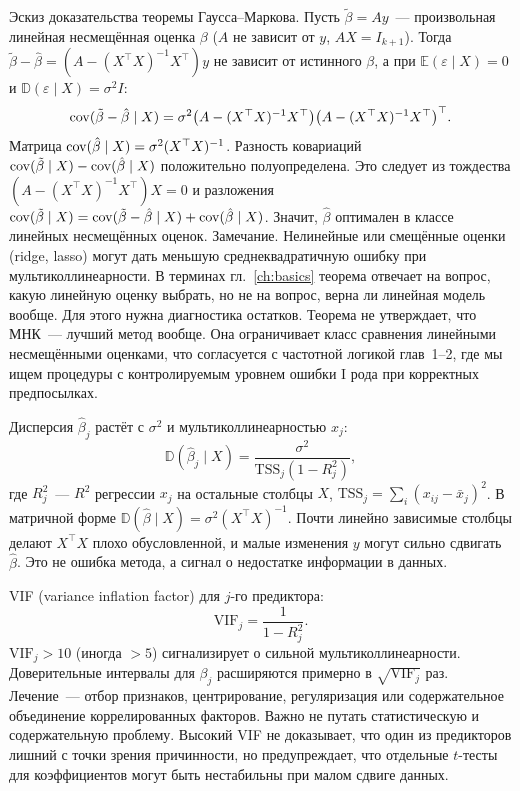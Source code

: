Эскиз доказательства теоремы Гаусса--Маркова. Пусть $\tilde\beta=Ay$~--- произвольная линейная несмещённая оценка $\beta$ ($A$ не зависит от $y$, $AX=I_{k+1}$).
Тогда $\tilde\beta-\hat\beta=(A-(X^\top X)^{-1}X^\top)y$ не зависит от истинного $\beta$, а при $\mathbb{E}(\varepsilon\mid X)=0$ и $\mathbb{D}(\varepsilon\mid X)=\sigma^2 I$:
\[ \operatorname{cov}(\tilde\beta-\hat\beta\mid X) =\sigma^2\bigl(A-(X^\top X)^{-1}X^\top\bigr) \bigl(A-(X^\top X)^{-1}X^\top\bigr)^\top.
\]
Матрица $\operatorname{cov}(\hat\beta\mid X)=\sigma^2(X^\top X)^{-1}$.
Разность ковариаций $\operatorname{cov}(\tilde\beta\mid X)-\operatorname{cov}(\hat\beta\mid X)$ положительно полуопределена. Это следует из тождества $(A-(X^\top X)^{-1}X^\top)X=0$ и разложения $\operatorname{cov}(\tilde\beta\mid X)=\operatorname{cov}(\tilde\beta-\hat\beta\mid X)+\operatorname{cov}(\hat\beta\mid X)$.
Значит, $\hat\beta$ оптимален в классе линейных несмещённых оценок.
Замечание. Нелинейные или смещённые оценки (ridge, lasso) могут дать меньшую среднеквадратичную ошибку при мультиколлинеарности.
В терминах гл.~\ref{ch:basics} теорема отвечает на вопрос, какую линейную оценку выбрать, но не на вопрос, верна ли линейная модель вообще. Для этого нужна диагностика остатков.
Теорема не утверждает, что МНК~--- лучший метод вообще. Она ограничивает класс сравнения линейными несмещёнными оценками, что согласуется с частотной логикой глав~1--2, где мы ищем процедуры с контролируемым уровнем ошибки I рода при корректных предпосылках.

Дисперсия $\hat\beta_j$ растёт с $\sigma^2$ и мультиколлинеарностью $x_j$:
\[ \mathbb{D}(\hat\beta_j\mid X)=\frac{\sigma^2}{\mathrm{TSS}_j(1-R_j^2)}, \]
где $R_j^2$~--- $R^2$ регрессии $x_j$ на остальные столбцы $X$, $\mathrm{TSS}_j=\sum_i(x_{ij}-\bar x_j)^2$.
В матричной форме $\mathbb{D}(\hat\beta\mid X)=\sigma^2(X^\top X)^{-1}$. Почти линейно зависимые столбцы делают $X^\top X$ плохо обусловленной, и малые изменения $y$ могут сильно сдвигать $\hat\beta$. Это не ошибка метода, а сигнал о недостатке информации в данных.

VIF (variance inflation factor) для $j$-го предиктора:
\[ \mathrm{VIF}_j=\frac{1}{1-R_j^2}.
\]
$\mathrm{VIF}_j>10$ (иногда $>5$) сигнализирует о сильной мультиколлинеарности. Доверительные интервалы для $\beta_j$ расширяются примерно в $\sqrt{\mathrm{VIF}_j}$ раз. Лечение~--- отбор признаков, центрирование, регуляризация или содержательное объединение коррелированных факторов.
Важно не путать статистическую и содержательную проблему. Высокий VIF не доказывает, что один из предикторов лишний с точки зрения причинности, но предупреждает, что отдельные $t$-тесты для коэффициентов могут быть нестабильны при малом сдвиге данных.

